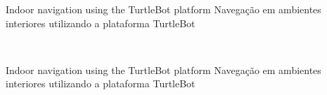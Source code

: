 %
%

\TitlePage
         {\ThesisYear}
        {Indoor navigation using the TurtleBot platform \newline Navegação em ambientes interiores utilizando a plataforma TurtleBot}
        
\EndTitlePage
\titlepage\ \endtitlepage %


%
%

\TitlePage
  \HEADER{}{\ThesisYear}
        {Indoor navigation using the TurtleBot platform \newline Navegação em ambientes interiores utilizando a plataforma TurtleBot}
  \vspace*{15mm}
  \TEXT{}
       {%
        }
        \vspace*{85mm}
\EndTitlePage
\titlepage\ \endtitlepage %

